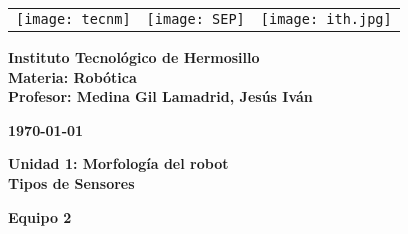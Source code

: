 \begin{titlepage}
	\centering
	\begin{tabular}{@{}p{} p{} p{}@{}}
		\texttt{[image: tecnm]} & 
		\centering \texttt{[image: SEP]} & 
		\raggedleft \texttt{[image: ith.jpg]} \\
	\end{tabular}
	
	\vspace{2em}
	
	\noindent
	\begin{minipage}[t]{0.48\textwidth}
		\raggedright
		\small \textbf{%
			Instituto Tecnológico de Hermosillo\\
			Materia: Robótica\\
			Profesor: Medina Gil Lamadrid, Jesús Iván%
		}
	\end{minipage}%
	\hfill
	\begin{minipage}[t]{0.48\textwidth}
		\raggedleft
		\small \textbf{\today}
	\end{minipage}
	
	\vspace{2em}
	
	{\large \textbf{Unidad 1: Morfología del robot}}\\
	{\Huge \textbf{Tipos de Sensores}}
		
	\vspace{1em}
	
	\begin{center}
		{\Large \textbf{Equipo 2}}
	\end{center}
	
	\vspace{1em}
	

\end{titlepage}
